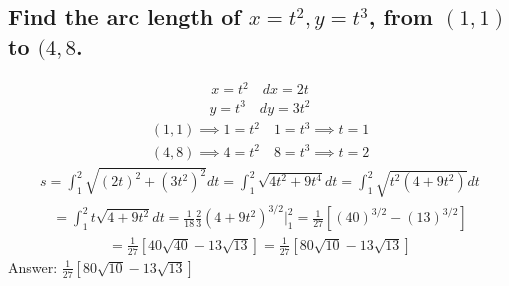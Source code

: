 \documentclass{article}
\begin{document}
\subsection{Find the arc length of $x = t^2, y = t^3$, from $(1, 1)$ to $(4, 8$.}
\begin{align*}
	x = t^2 \quad dx = 2t
\end{align*}
\begin{align*}
	y = t^3 \quad dy = 3t^2
\end{align*}
\begin{align*}
	(1,1) \implies 1 = t^2 \quad 1 = t^3 \implies t = 1
\end{align*}
\begin{align*}
	(4,8) \implies 4 = t^2 \quad 8 = t^3 \implies t = 2
\end{align*}
\begin{align*}
	s = \int_1^2 {\sqrt{(2t)^2 + (3t^2)^2}}dt = \int_1^2 {\sqrt{4t^2 + 9t^4}}dt = \int_1^2 {\sqrt{t^2(4 + 9t^2)}}dt
\end{align*}
\begin{align*}
	= \int_1^2 {t\sqrt{4 + 9t^2}}dt = \frac{1}{18} \frac{2}{3} (4 + 9t^2)^{3/2} \bigg|_1^2 = \frac{1}{27} [(40)^{3/2} - (13)^{3/2}]
\end{align*}
\begin{align*}
	= \frac{1}{27} [40\sqrt{40} - 13\sqrt{13}] = \frac{1}{27} [80\sqrt{10} - 13\sqrt{13}]
\end{align*}
Answer: $\frac{1}{27} [80\sqrt{10} - 13\sqrt{13}]$

\end{document}

